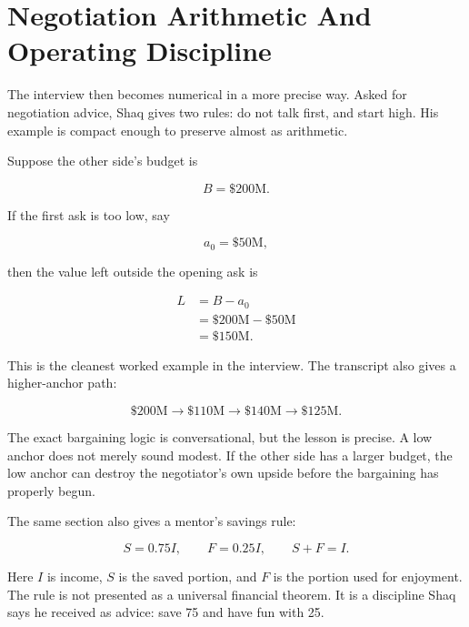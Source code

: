 \section{Negotiation Arithmetic And Operating Discipline}

The interview then becomes numerical in a more precise way. Asked for negotiation advice, Shaq gives two rules: do not talk first, and start high. His example is compact enough to preserve almost as arithmetic.

Suppose the other side's budget is

\begin{equation}
B = \$200\mathrm{M}.
\end{equation}

If the first ask is too low, say

\begin{equation}
a_0 = \$50\mathrm{M},
\end{equation}

then the value left outside the opening ask is

\begin{align}
L
&= B-a_0 \\
&= \$200\mathrm{M}-\$50\mathrm{M} \\
&= \$150\mathrm{M}.
\end{align}

This is the cleanest worked example in the interview. The transcript also gives a higher-anchor path:

\begin{equation}
\$200\mathrm{M}
\rightarrow
\$110\mathrm{M}
\rightarrow
\$140\mathrm{M}
\rightarrow
\$125\mathrm{M}.
\end{equation}

The exact bargaining logic is conversational, but the lesson is precise. A low anchor does not merely sound modest. If the other side has a larger budget, the low anchor can destroy the negotiator's own upside before the bargaining has properly begun.

The same section also gives a mentor's savings rule:

\begin{equation}
S = 0.75I,
\qquad
F = 0.25I,
\qquad
S+F=I.
\end{equation}

Here \(I\) is income, \(S\) is the saved portion, and \(F\) is the portion used for enjoyment. The rule is not presented as a universal financial theorem. It is a discipline Shaq says he received as advice: save 75 and have fun with 25.

